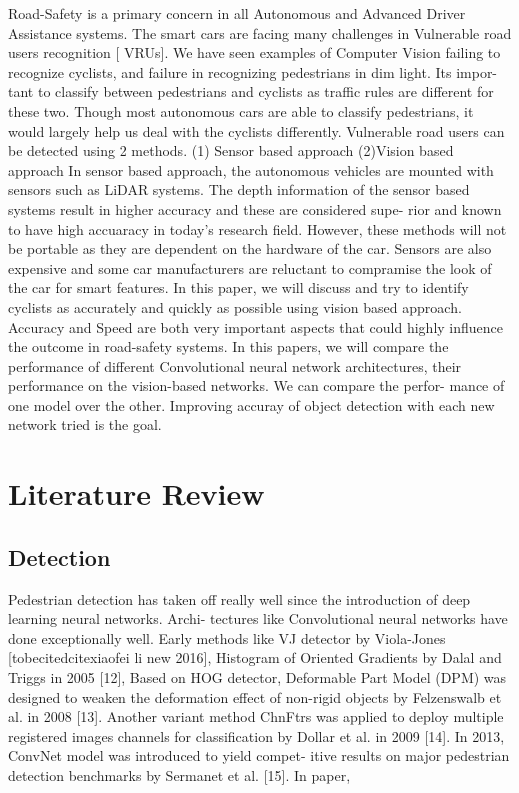 \documentclass[11pt]{article}\usepackage[]{graphicx}\usepackage[]{color}
\begin{document}
Road-Safety is a primary concern in all Autonomous and Advanced Driver Assistance systems. The smart
cars are facing many challenges in Vulnerable road users recognition [ VRUs]. We have seen examples of
Computer Vision failing to recognize cyclists, and failure in recognizing pedestrians in dim light. Its impor-
tant to classify between pedestrians and cyclists as traffic rules are different for these two. Though most
autonomous cars are able to classify pedestrians, it would largely help us deal with the cyclists differently.
Vulnerable road users can be detected using 2 methods.
(1) Sensor based approach
(2)Vision based approach
In sensor based approach, the autonomous vehicles are mounted with sensors such as LiDAR systems.
The depth information of the sensor based systems result in higher accuracy and these are considered supe-
rior and known to have high accuaracy in today’s research field. However, these methods will not be portable
as they are dependent on the hardware of the car. Sensors are also expensive and some car manufacturers
are reluctant to compramise the look of the car for smart features.
In this paper, we will discuss and try to identify cyclists as accurately and quickly as possible using
vision based approach. Accuracy and Speed are both very important aspects that could highly influence the
outcome in road-safety systems. In this papers, we will compare the performance of different Convolutional
neural network architectures, their performance on the vision-based networks. We can compare the perfor-
mance of one model over the other. Improving accuray of object detection with each new network tried is
the goal.

\section{Literature Review}

\subsection{Detection}
Pedestrian detection has taken off really well since the introduction of deep learning neural networks. Archi-
tectures like Convolutional neural networks have done exceptionally well. Early methods like VJ detector by
Viola-Jones [tobecitedcitexiaofei li new 2016], Histogram of Oriented Gradients by Dalal and Triggs in 2005
[12], Based on HOG detector, Deformable Part Model (DPM) was designed to weaken the deformation effect
of non-rigid objects by Felzenswalb et al. in 2008 [13]. Another variant method ChnFtrs was applied to
deploy multiple registered images channels for classification by Dollar et al. in 2009 [14]. In 2013, ConvNet
model was introduced to yield compet- itive results on major pedestrian detection benchmarks by Sermanet
et al. [15].
In paper,
\end{document}
